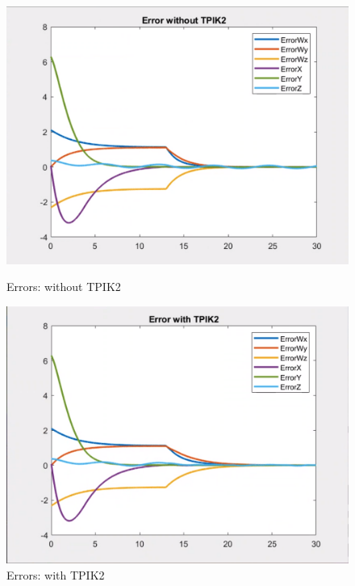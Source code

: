 \documentclass{article}
\begin{document}
\begin{figure}[htpb] 
\begin{minipage}{0.40\textwidth} 
\includegraphics[width=\textwidth]{522_2_wout_TPIK2.png} 
\caption[Errors: without TPIK2]{Errors: without TPIK2}\label{Error_wout_TPIK2} 
\end{minipage} 
\hspace{0.2\textwidth} 
\begin{minipage}{0.40\textwidth}  
\includegraphics[width=\textwidth]{522_2_w_TPIK2.png}
\caption[Errors: with TPIK2]{Errors: with TPIK2}\label{Error_w_TPIK2} 
\end{minipage}  
\end{figure}
\end{document}
